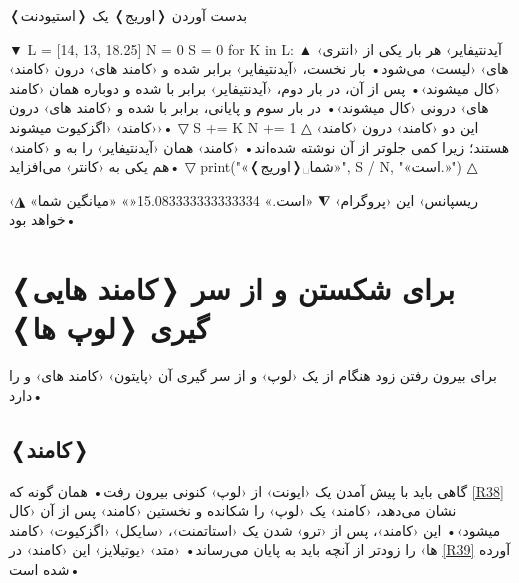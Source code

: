 \documentclass[openany, twocolumn]{book}
\begin{document}
\begin{Program}
\caption{بدست آوردن ❬اوریج❭ یک ❬استیودنت❭\label{R37}}

▼
L = [14, 13, 18.25]
N = 0
S = 0
for K in L:
▲
 ‹آیدنتیفایر›  هر بار یکی از ‹انتری های› ‹لیست›  می‌شود• بار نخست، ‹آیدنتیفایر›  برابر  شده و ‹کامند های› درون ‹کامند›  ‹کال میشوند›• پس از آن، در بار دوم، ‹آیدنتیفایر›  برابر با  شده و دو‌باره همان ‹کامند های› درونی ‹کال میشوند›• در بار سوم و پایانی،  برابر با  شده و ‹کامند های› درون ‹کامند›  ‹اگزکیوت میشوند›• 
▽
	S += K
	N += 1
△
 این دو ‹کامند› درون ‹کامند›  هستند؛ زیرا کمی جلو‌تر از آن نوشته شده‌اند• ‹کامند›  همان ‹آیدنتیفایر›  را به  و ‹کامند›  هم یکی به ‹کانتر›  می‌افزاید• 
▽
print("«❬اوریج❭␣شما»", S / N, "«است.»")
△

‹ریسپانس› این ‹پروگرام› 
⧩
«است.» 15.083333333333334«\NewNoteMark» «میانگین شما»
◮
 خواهد بود•
\end{Program}

\section{❬کامند هایی❭ برای شکستن و از سر گیری ❬لوپ ها❭}
برای بیرون رفتن زود هنگام از یک ‹لوپ› و از سر گیری آن ‹پایتون› ‹کامند های›  و  را دارد•

\subsection{❬کامند❭ }
گاهی باید با پیش آمدن یک ‹ایونت› از ‹لوپ› کنونی بیرون رفت• همان گونه که \ref{R38} نشان می‌دهد، ‹کامند›  یک ‹لوپ› را شکانده و نخستین ‹کامند› پس از آن ‹کال میشود›• این ‹کامند›، پس از ‹ترو› شدن یک ‹استاتمنت›، ‹سایکل› ‹اگزکیوت› ‹کامند ها› را زود‌تر از آنچه باید به پایان می‌رساند• ‹متد› ‹یوتیلایز› این ‹کامند› در \ref{R39} آورده شده است•
\end{document}
